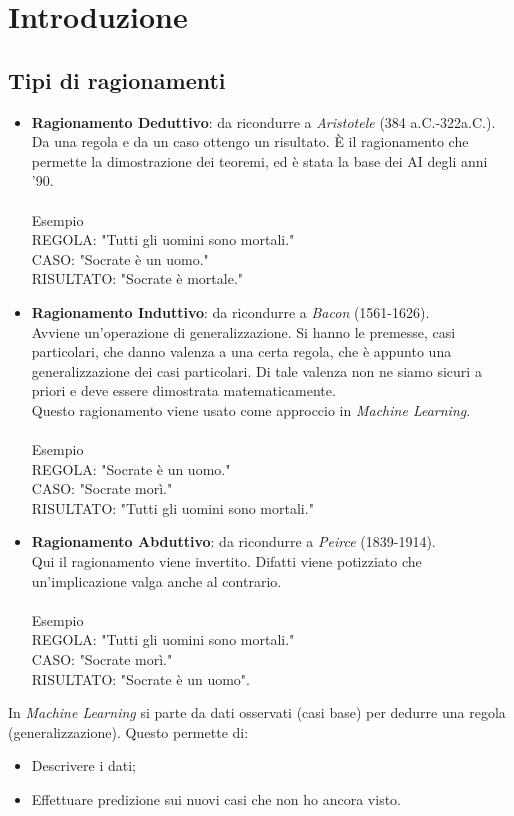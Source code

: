 \documentclass[10pt,a4paper]{book}
\begin{document}
\chapter{Introduzione}

\section{Tipi di ragionamenti}
\begin{itemize}
\item \textbf{Ragionamento Deduttivo}: da ricondurre a \textit{Aristotele} (384 a.C.-322a.C.).\\
Da una regola e da un caso ottengo un risultato. \`E il ragionamento che permette la dimostrazione dei teoremi, ed \`e stata la base dei AI degli anni '90.\\\\
Esempio\\
REGOLA: "Tutti gli uomini sono mortali."\\
CASO: "Socrate \`e un uomo."\\
RISULTATO: "Socrate \`e mortale."
\item \textbf{Ragionamento Induttivo}: da ricondurre a \textit{Bacon} (1561-1626).\\
Avviene un'operazione di generalizzazione. Si hanno le premesse, casi particolari, che danno valenza a una certa regola, che \`e appunto una generalizzazione dei casi particolari. Di tale valenza non ne siamo sicuri a priori e deve essere dimostrata matematicamente.\\
Questo ragionamento viene usato come approccio in \textit{Machine Learning}.\\\\
Esempio\\
REGOLA: "Socrate \`e un uomo."\\
CASO: "Socrate mor\`i."\\
RISULTATO: "Tutti gli uomini sono mortali."
\item \textbf{Ragionamento Abduttivo}: da ricondurre a \textit{Peirce} (1839-1914).\\
Qui il ragionamento viene invertito. Difatti viene potizziato che un'implicazione valga anche al contrario.\\\\
Esempio\\
REGOLA: "Tutti gli uomini sono mortali."\\
CASO: "Socrate mor\`i."\\
RISULTATO: "Socrate \`e un uomo".
\end{itemize}
\noindent
In \textit{Machine Learning} si parte da dati osservati (casi base) per dedurre una regola (generalizzazione). Questo permette di:
\begin{itemize}
\item Descrivere i dati;
\item Effettuare predizione sui nuovi casi che non ho ancora visto.
\end{itemize}
\end{document}
